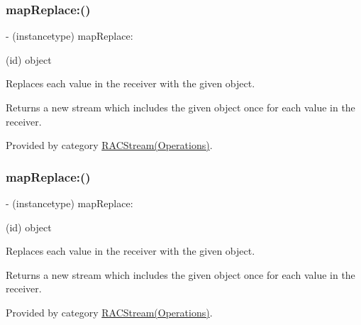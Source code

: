 \subsubsection{\texorpdfstring{map\+Replace\+:()}{mapReplace:()}\hspace{0.1cm}{\footnotesize\ttfamily [2/3]}}
{\footnotesize\ttfamily -\/ (instancetype) map\+Replace\+: \begin{DoxyParamCaption}\item[{(id)}]{object }\end{DoxyParamCaption}}

Replaces each value in the receiver with the given object.

Returns a new stream which includes the given object once for each value in the receiver. 

Provided by category \mbox{\hyperlink{category_r_a_c_stream_07_operations_08_a9e55da434f4cf84e14f9133ac48383b8}{R\+A\+C\+Stream(\+Operations)}}.

\mbox{\label{interface_r_a_c_stream_a9e55da434f4cf84e14f9133ac48383b8}} 
\subsubsection{\texorpdfstring{map\+Replace\+:()}{mapReplace:()}\hspace{0.1cm}{\footnotesize\ttfamily [3/3]}}
{\footnotesize\ttfamily -\/ (instancetype) map\+Replace\+: \begin{DoxyParamCaption}\item[{(id)}]{object }\end{DoxyParamCaption}}

Replaces each value in the receiver with the given object.

Returns a new stream which includes the given object once for each value in the receiver. 

Provided by category \mbox{\hyperlink{category_r_a_c_stream_07_operations_08_a9e55da434f4cf84e14f9133ac48383b8}{R\+A\+C\+Stream(\+Operations)}}.

\mbox{\label{interface_r_a_c_stream_aaf04bf295d943b85860ae5cc3d5851ff}} 
